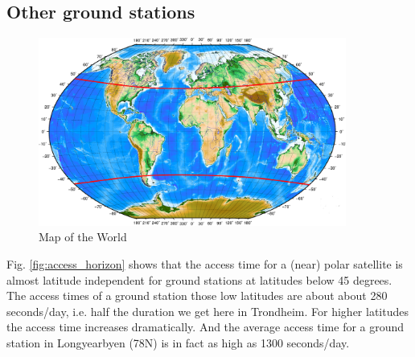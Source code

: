 \subsection{Other ground stations}
\begin{figure}
  \begin{center}
    \includegraphics[width=0.9\textwidth]{Figures/verdenskart}
  \end{center}
  \caption[world]{Map of the World}
  \label{fig:world}
\end{figure}

Fig. \ref{fig:access_horizon} shows that the access time for a (near) polar satellite is almost latitude independent for ground stations at latitudes below 45 degrees. The access times of a ground station those low latitudes are about about 280 seconds/day, i.e. half the duration we get here in Trondheim. For higher latitudes the access time increases dramatically. And the average access time for a ground station in Longyearbyen (78N) is in fact as high as 1300 seconds/day.
